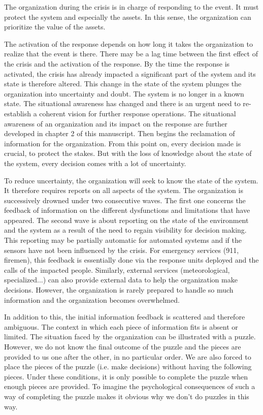 The organization during the crisis is in charge of responding to the event.
It must protect the system and especially the assets.
In this sense, the organization can prioritize the value of the assets.

The activation of the response depends on how long it takes the organization to realize that the event is there.
There may be a lag time between the first effect of the crisis and the activation of the response.
By the time the response is activated, the crisis has already impacted a significant part of the system and its state is therefore altered.
This change in the state of the system plunges the organization into uncertainty and doubt.
The system is no longer in a known state.
The situational awareness has changed and there is an urgent need to re-establish a coherent vision for further response operations.
The situational awareness of an organization and its impact on the response are further developed in chapter 2 of this manuscript.
Then begins the reclamation of information for the organization.
From this point on, every decision made is crucial, to protect the stakes.
But with the loss of knowledge about the state of the system, every decision comes with a lot of uncertainty.

To reduce uncertainty, the organization will seek to know the state of the system.
It therefore requires reports on all aspects of the system.
The organization is successively drowned under two consecutive waves.
The first one concerns the feedback of information on the different dysfunctions and limitations that have appeared.
The second wave is about reporting on the state of the environment and the system as a result of the need to regain visibility for decision making.
This reporting may be partially automatic for automated systems and if the sensors have not been influenced by the crisis.
For emergency services (911, firemen), this feedback is essentially done via the response units deployed and the calls of the impacted people.
Similarly, external services (meteorological, specialized...) can also provide external data to help the organization make decisions.
However, the organization is rarely prepared to handle so much information and the organization becomes overwhelmed.

In addition to this, the initial information feedback is scattered and therefore ambiguous.
The context in which each piece of information fits is absent or limited.
The situation faced by the organization can be illustrated with a puzzle.
However, we do not know the final outcome of the puzzle and the pieces are provided to us one after the other, in no particular order.
We are also forced to place the pieces of the puzzle (i.e. make decisions) without having the following pieces.
Under these conditions, it is only possible to complete the puzzle when enough pieces are provided.
To imagine the psychological consequences of such a way of completing the puzzle makes it obvious why we don't do puzzles in this way.

